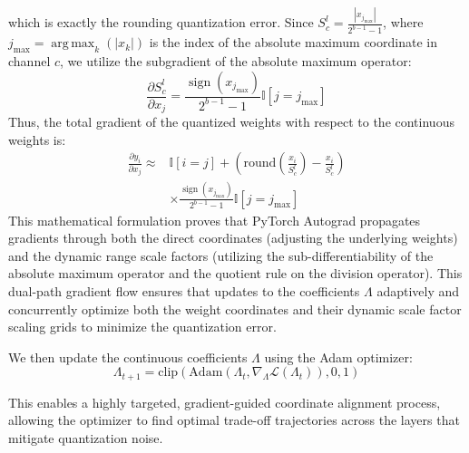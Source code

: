 which is exactly the rounding quantization error. Since $S^l_c = \frac{|x_{j_{\max}}|}{2^{b-1}-1}$, where $j_{\max} = \operatorname{arg\,max}_k (|x_k|)$ is the index of the absolute maximum coordinate in channel $c$, we utilize the subgradient of the absolute maximum operator:
\begin{equation}
    \frac{\partial S^l_c}{\partial x_j} = \frac{\operatorname{sign}(x_{j_{\max}})}{2^{b-1}-1} \mathbb{I}[j = j_{\max}]
\end{equation}
Thus, the total gradient of the quantized weights with respect to the continuous weights is:
\begin{equation}
\begin{aligned}
    \frac{\partial y_i}{\partial x_j} \approx {} & \mathbb{I}[i=j] + \left( \text{round}\left(\frac{x_i}{S^l_c}\right) - \frac{x_i}{S^l_c} \right) \\
    & \times \frac{\operatorname{sign}(x_{j_{\max}})}{2^{b-1}-1} \mathbb{I}[j = j_{\max}]
\end{aligned}
\end{equation}
This mathematical formulation proves that PyTorch Autograd propagates gradients through both the direct coordinates (adjusting the underlying weights) and the dynamic range scale factors (utilizing the sub-differentiability of the absolute maximum operator and the quotient rule on the division operator). This dual-path gradient flow ensures that updates to the coefficients $\Lambda$ adaptively and concurrently optimize both the weight coordinates and their dynamic scale factor scaling grids to minimize the quantization error.

We then update the continuous coefficients $\Lambda$ using the Adam optimizer:
\begin{equation}
    \Lambda_{t+1} = \text{clip}\left(\text{Adam}\left(\Lambda_t, \nabla_{\Lambda} \mathcal{L}(\Lambda_t)\right), 0, 1\right)
\end{equation}

This enables a highly targeted, gradient-guided coordinate alignment process, allowing the optimizer to find optimal trade-off trajectories across the layers that mitigate quantization noise.

